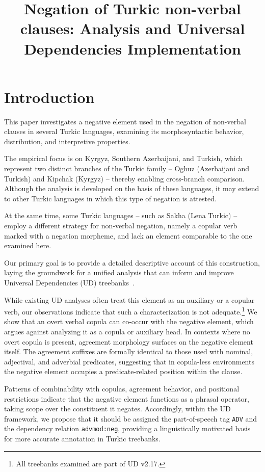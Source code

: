 \documentclass[10pt, a4paper]{article}
\title{Negation of Turkic non-verbal clauses: Analysis and Universal Dependencies Implementation}
\newcommand{\upos}[1]{\texttt{#1}}
\newcommand{\rel}[1]{\texttt{#1}}
\begin{document}
\maketitleabstract

\section{Introduction}

This paper investigates a negative element used in the negation of non-verbal clauses in several Turkic languages, examining its morphosyntactic behavior, distribution, and interpretive properties.

The empirical focus is on Kyrgyz, Southern Azerbaijani, and Turkish, which represent two distinct branches of the Turkic family -- Oghuz (Azerbaijani and Turkish) and Kipchak (Kyrgyz) -- thereby enabling cross-branch comparison.
Although the analysis is developed on the basis of these languages, it may extend to other Turkic languages in which this type of negation is attested.

At the same time, some Turkic languages -- such as Sakha (Lena Turkic) -- employ a different strategy for non-verbal negation, namely a copular verb marked with a negation morpheme, and lack an element comparable to the one examined here.

Our primary goal is to provide a detailed descriptive account of this construction, laying the groundwork for a unified analysis that can inform and improve Universal Dependencies (UD) treebanks~\citep{demarneffe2021,akhundjanova-etal-2025-parallel}.

While existing UD analyses often treat this element as an auxiliary or a copular verb, our observations indicate that such a characterization is not adequate.\footnote{All treebanks examined are part of UD v2.17.} We show that an overt verbal copula can co-occur with the negative element, which argues against analyzing it as a copula or auxiliary head.
In contexts where no overt copula is present, agreement morphology surfaces on the negative element itself.
The agreement suffixes are formally identical to those used with nominal, adjectival, and adverbial predicates, suggesting that in copula-less environments the negative element occupies a predicate-related position within the clause.

Patterns of combinability with copulas, agreement behavior, and positional restrictions indicate that the negative element functions as a phrasal operator, taking scope over the constituent it negates.
Accordingly, within the UD framework, we propose that it should be assigned the part-of-speech tag \upos{ADV} and the dependency relation \rel{advmod:neg}, providing a linguistically motivated basis for more accurate annotation in Turkic treebanks.
\end{document}
